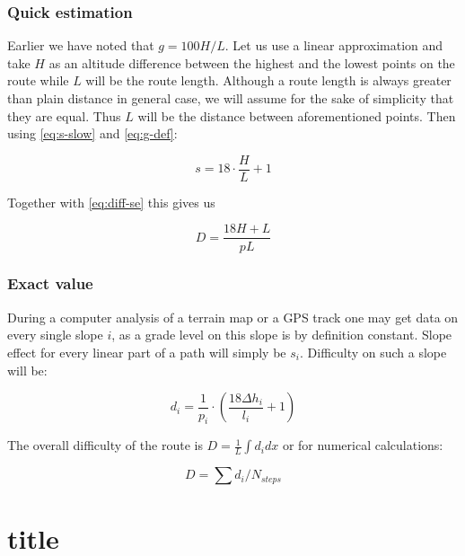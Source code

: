 \documentclass[12pt]{article}
\begin{document}
\subsubsection{Quick estimation}
Earlier we have noted that $g = 100 H / L$. Let us use a linear approximation and take $H$ as an altitude difference between the highest and the lowest points on the route while $L$ will be the route length. Although a route length is always greater than plain distance in general case, we will assume for the sake of simplicity that they are equal. Thus $L$ will be the distance between aforementioned points. Then using \ref{eq:s-slow} and \ref{eq:g-def}:

\begin{equation*}
s = 18\cdot\frac{H}{L} + 1
\end{equation*}

Together with \ref{eq:diff-se} this gives us

\begin{equation*}
D = \frac{18 H + L}{pL}
\end{equation*}

\subsubsection{Exact value}

During a computer analysis of a terrain map or a GPS track one may get data on every single slope $i$, as a grade level on this slope is by definition constant. Slope effect for every linear part of a path will simply be $s_{i}$. Difficulty on such a slope will be:

\begin{equation}
d_{i} = \frac{1}{p_{i}} \cdot (\frac{18 \Delta h_{i}}{l_{i}} + 1)
\end{equation}

The overall difficulty of the route is $D = \frac{1}{L} \int d_{i} dx$ or for numerical calculations:

\begin{equation}
D = \sum d_{i} / N_{steps}
\end{equation}


\section{title}


\newpage
\appendix


\end{document}
